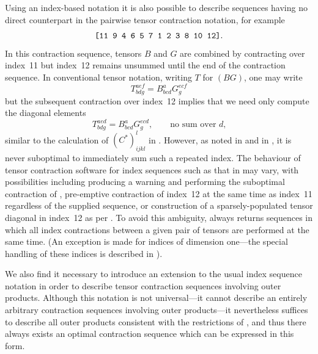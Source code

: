 Using an index-based notation it is also possible to describe sequences having no direct counterpart in the pairwise tensor contraction notation, for example
\begin{equation}
\texttt{[11 9 4 6 5 7 1 2 3 8 10 12]}.\label{eq:deferredtrace}
\end{equation}
In this contraction sequence, tensors $B$ and $G$ are combined by contracting over index~11 but index~12 remains unsummed until the end of the contraction sequence. In conventional tensor notation, writing $T$ for $(BG)$, one may write
\begin{equation}
T^{aef}_{bdg}=B^a_{bcd}G^{ecf}_g\label{eq:suboptimal}
\end{equation}
but the subsequent contraction over index~12 implies that we need only compute the diagonal elements
\begin{equation}
T^{aed}_{bdg}=B^a_{bcd}G^{ecd}_g,\qquad\textrm{no sum over $d$,}\label{eq:sparsetensor}
\end{equation}
similar to the calculation of $\left(C^*\right)^l_{ijkl}$ in . However, as noted in  and in , it is never suboptimal to immediately sum such a repeated index. The behaviour of tensor contraction software for index sequences such as that in  may vary, with possibilities including producing a warning and performing the suboptimal contraction of , pre-emptive contraction of index~12 at the same time as index~11 regardless of the supplied sequence, or construction of a sparsely-populated tensor diagonal in index~12 as per . To avoid this ambiguity,  always returns sequences in which all index contractions between a given pair of tensors are performed at the same time. (An exception is made for indices of dimension one---the special handling of these indices is described in ).

We also find it necessary to introduce an extension to the usual index sequence notation in order to describe tensor contraction sequences involving outer products. Although this notation is not universal---it cannot describe an entirely arbitrary contraction sequences involving outer products---it nevertheless suffices to describe all outer products consistent with the restrictions of , and thus there always exists an optimal contraction sequence which can be expressed in this form.

